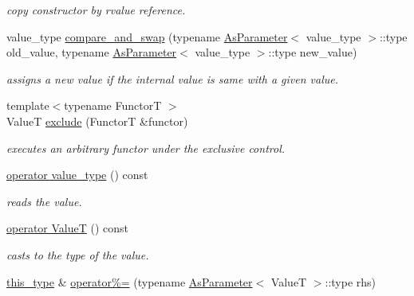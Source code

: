 \begin{DoxyCompactItemize}
\begin{DoxyCompactList}\small\item\em copy constructor by rvalue reference. \end{DoxyCompactList}\item 
value\-\_\-type \hyperlink{group__atomic__operation_ga39b7ebbb7b13b8b1a0b05a4e04f4176f}{compare\-\_\-and\-\_\-swap} (typename \hyperlink{classhryky_1_1_as_parameter}{As\-Parameter}$<$ value\-\_\-type $>$\-::type old\-\_\-value, typename \hyperlink{classhryky_1_1_as_parameter}{As\-Parameter}$<$ value\-\_\-type $>$\-::type new\-\_\-value)
\begin{DoxyCompactList}\small\item\em assigns a new value if the internal value is same with a given value. \end{DoxyCompactList}\item 
{\footnotesize template$<$typename Functor\-T $>$ }\\Value\-T \hyperlink{group__atomic__operation_gae595f32af60a397c190c0d02fd5da565}{exclude} (Functor\-T \&functor)
\begin{DoxyCompactList}\small\item\em executes an arbitrary functor under the exclusive control. \end{DoxyCompactList}\item 
\hyperlink{classhryky_1_1atomic_1_1_accessor_a9d4f987caab0e8bf6bda4c31d957af15}{operator value\-\_\-type} () const 
\begin{DoxyCompactList}\small\item\em reads the value. \end{DoxyCompactList}\item 
\hypertarget{group__atomic__operation_ga0d1ed1c369001d0f8bb4cdcacc0ea38b}{\hyperlink{group__atomic__operation_ga0d1ed1c369001d0f8bb4cdcacc0ea38b}{operator Value\-T} () const }\label{group__atomic__operation_ga0d1ed1c369001d0f8bb4cdcacc0ea38b}

\begin{DoxyCompactList}\small\item\em casts to the type of the value. \end{DoxyCompactList}\item 
\hypertarget{classhryky_1_1atomic_1_1_accessor_acb3ce30384f937b624d9c6bf682ff11b}{\hyperlink{classhryky_1_1atomic_1_1_accessor_a4957c9dc8163f5fb426f5eb8de5fcd12}{this\-\_\-type} \& \hyperlink{classhryky_1_1atomic_1_1_accessor_acb3ce30384f937b624d9c6bf682ff11b}{operator\%=} (typename \hyperlink{classhryky_1_1_as_parameter}{As\-Parameter}$<$ Value\-T $>$\-::type rhs)}\label{classhryky_1_1atomic_1_1_accessor_acb3ce30384f937b624d9c6bf682ff11b}


\end{DoxyCompactItemize}
